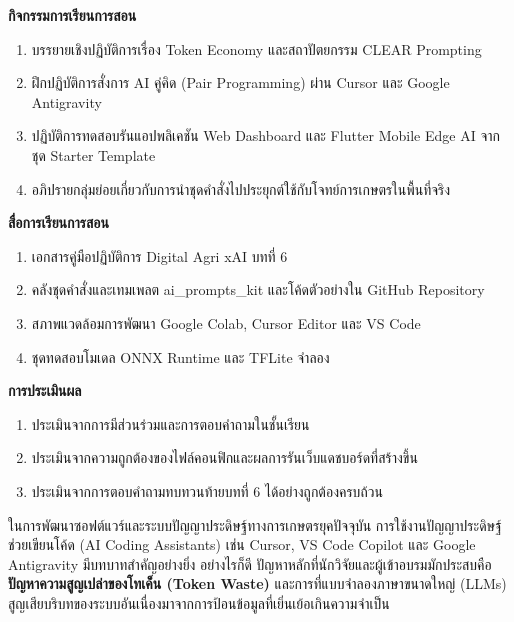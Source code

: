 \noindent\textbf{กิจกรรมการเรียนการสอน}
\begin{enumerate}
    \item บรรยายเชิงปฏิบัติการเรื่อง Token Economy และสถาปัตยกรรม CLEAR Prompting
    \item ฝึกปฏิบัติการสั่งการ AI คู่คิด (Pair Programming) ผ่าน Cursor และ Google Antigravity
    \item ปฏิบัติการทดสอบรันแอปพลิเคชัน Web Dashboard และ Flutter Mobile Edge AI จากชุด Starter Template
    \item อภิปรายกลุ่มย่อยเกี่ยวกับการนำชุดคำสั่งไปประยุกต์ใช้กับโจทย์การเกษตรในพื้นที่จริง
\end{enumerate}

\noindent\textbf{สื่อการเรียนการสอน}
\begin{enumerate}
    \item เอกสารคู่มือปฏิบัติการ Digital Agri xAI บทที่ 6
    \item คลังชุดคำสั่งและเทมเพลต ai\_prompts\_kit และโค้ดตัวอย่างใน GitHub Repository
    \item สภาพแวดล้อมการพัฒนา Google Colab, Cursor Editor และ VS Code
    \item ชุดทดสอบโมเดล ONNX Runtime และ TFLite จำลอง
\end{enumerate}

\noindent\textbf{การประเมินผล}
\begin{enumerate}
    \item ประเมินจากการมีส่วนร่วมและการตอบคำถามในชั้นเรียน
    \item ประเมินจากความถูกต้องของไฟล์คอนฟิกและผลการรันเว็บแดชบอร์ดที่สร้างขึ้น
    \item ประเมินจากการตอบคำถามทบทวนท้ายบทที่ 6 ได้อย่างถูกต้องครบถ้วน
\end{enumerate}

\newpage



ในการพัฒนาซอฟต์แวร์และระบบปัญญาประดิษฐ์ทางการเกษตรยุคปัจจุบัน การใช้งานปัญญาประดิษฐ์ช่วยเขียนโค้ด (AI Coding Assistants) เช่น Cursor, VS Code Copilot และ Google Antigravity มีบทบาทสำคัญอย่างยิ่ง อย่างไรก็ดี ปัญหาหลักที่นักวิจัยและผู้เข้าอบรมมักประสบคือ \textbf{ปัญหาความสูญเปล่าของโทเค็น (Token Waste)} และการที่แบบจำลองภาษาขนาดใหญ่ (LLMs) สูญเสียบริบทของระบบอันเนื่องมาจากการป้อนข้อมูลที่เยิ่นเย้อเกินความจำเป็น


